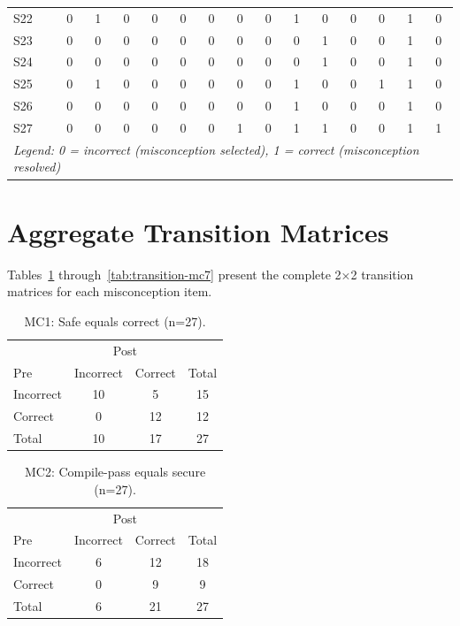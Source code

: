 \documentclass[11pt]{article}
\begin{document}
\begin{table}[h]
\begin{tabular}{l|ccccccc|ccccccc}
S22 & 0 & 1 & 0 & 0 & 0 & 0 & 0 & 0 & 1 & 0 & 0 & 0 & 1 & 0 \\
S23 & 0 & 0 & 0 & 0 & 0 & 0 & 0 & 0 & 0 & 1 & 0 & 0 & 1 & 0 \\
S24 & 0 & 0 & 0 & 0 & 0 & 0 & 0 & 0 & 0 & 1 & 0 & 0 & 1 & 0 \\
S25 & 0 & 1 & 0 & 0 & 0 & 0 & 0 & 0 & 1 & 0 & 0 & 1 & 1 & 0 \\
S26 & 0 & 0 & 0 & 0 & 0 & 0 & 0 & 0 & 1 & 0 & 0 & 0 & 1 & 0 \\
S27 & 0 & 0 & 0 & 0 & 0 & 0 & 1 & 0 & 1 & 1 & 0 & 0 & 1 & 1 \\
\midrule
\multicolumn{15}{l}{\textit{Legend: 0 = incorrect (misconception selected), 1 = correct (misconception resolved)}} \\
\bottomrule
\end{tabular}
\end{table}

\section*{Aggregate Transition Matrices}

Tables~\ref{tab:transition-mc1} through~\ref{tab:transition-mc7} present the complete 2×2 transition matrices for each misconception item.

\begin{table}[h]
\centering
\caption{MC1: Safe equals correct (n=27).}
\label{tab:transition-mc1}
\begin{tabular}{l|cc|c}
\toprule
 & \multicolumn{2}{c|}{Post} & \multicolumn{1}{c}{} \\
Pre & Incorrect & Correct & Total \\
\midrule
Incorrect & 10 & 5 & 15 \\
Correct & 0 & 12 & 12 \\
\midrule
Total & 10 & 17 & 27 \\
\bottomrule
\end{tabular}
\end{table}

\begin{table}[h]
\centering
\caption{MC2: Compile-pass equals secure (n=27).}
\label{tab:transition-mc2}
\begin{tabular}{l|cc|c}
\toprule
 & \multicolumn{2}{c|}{Post} & \multicolumn{1}{c}{} \\
Pre & Incorrect & Correct & Total \\
\midrule
Incorrect & 6 & 12 & 18 \\
Correct & 0 & 9 & 9 \\
\midrule
Total & 6 & 21 & 27 \\
\bottomrule
\end{tabular}
\end{table}
\end{document}
